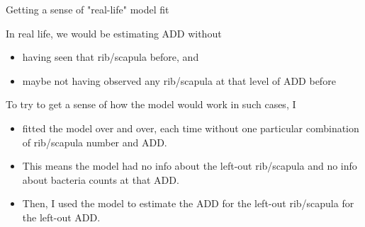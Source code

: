 \documentclass{beamer}
\begin{document}
\begin{frame}{Getting a sense of "real-life" model fit}

  \noindent In real life, we would be estimating ADD without
  \begin{itemize}
    \item having seen that rib/scapula before, and
    \item maybe not having observed any rib/scapula at that level of ADD before
  \end{itemize} 

  \vspace{0.1in}

  \noindent To try to get a sense of how the model would work in such cases, I
  \begin{itemize}
    \item fitted the model over and over, each time without one particular
    combination of rib/scapula number and ADD.
    \item This means the model had no info about the left-out rib/scapula and no
    info about bacteria counts at that ADD.
    \item Then, I used the model to estimate the ADD for the left-out
    rib/scapula for the left-out ADD.
  \end{itemize}
  
\end{frame}
\end{document}
